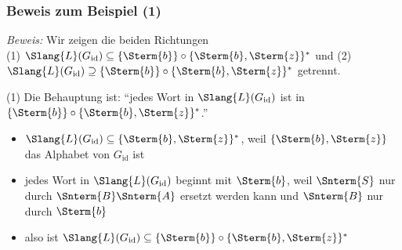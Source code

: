 \documentclass[aspectratio=1610,onlymath]{beamer}
\begin{document}
\begin{frame}\frametitle{Beweis zum Beispiel (1)}

\pause
\bigskip

\emph{Beweis:} Wir zeigen die beiden Richtungen\\ (1) $\Slang{L}(G_{\text{id}}) \subseteq \{\Sterm{b}\}\circ \{\Sterm{b},\Sterm{z}\}^*$ und (2) $\Slang{L}(G_{\text{id}}) \supseteq \{\Sterm{b}\}\circ \{\Sterm{b},\Sterm{z}\}^*$ getrennt.
\bigskip\pause

(1) Die Behauptung ist: "`jedes Wort in $\Slang{L}(G_{\text{id}})$ ist in $\{\Sterm{b}\}\circ \{\Sterm{b},\Sterm{z}\}^*$."'
\begin{itemize}
\item $\Slang{L}(G_{\text{id}})\subseteq \{\Sterm{b},\Sterm{z}\}^*$, weil $\{\Sterm{b},\Sterm{z}\}$ das Alphabet von $G_{\text{id}}$ ist
\item jedes Wort in $\Slang{L}(G_{\text{id}})$ beginnt mit $\Sterm{b}$, weil $\Snterm{S}$ nur durch $\Snterm{B}\Snterm{A}$ ersetzt werden kann und $\Snterm{B}$ nur durch $\Sterm{b}$
\item also ist $\Slang{L}(G_{\text{id}}) \subseteq \{\Sterm{b}\}\circ \{\Sterm{b},\Sterm{z}\}^*$
\end{itemize}

\end{frame}
\end{document}
